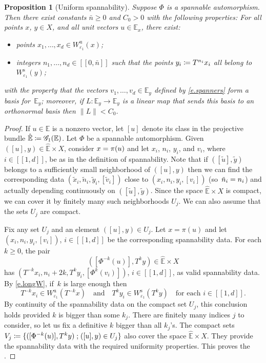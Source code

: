 \documentclass[JEP,XML,SOM,Unicode]{cedram}
\let\mathcal\mathscr
\newcommand{\ldbrack}{[\![}
\newcommand{\rdbrack}{]\!]}
\def\vcentcolon{\mathrel{\mathop\ordinarycolon}}
\providecommand\ordinarycolon{:}
\providecommand*\coloneqq{\vcentcolon\mathrel{\mkern-1.2mu}=}
\theoremstyle{plain}
\newtheorem{proposition}[theorem]{Proposition}
\theoremstyle{definition}
\newcommand{\EE}{\mathbb{E}}
\newcommand{\st}{\;\mathord{;}\;}
\newcommand{\uu}{\mathrm{u}}
\renewcommand{\ss}{\mathrm{s}}
\newcommand{\Gr}{\mathcal{G}}
\let\epsilon\varepsilon
\begin{document}
\begin{proposition}[Uniform spannability]\label{p.unif_span}
Suppose $\Phi$ is a spannable automorphism.
Then there exist constants $\bar{n} \ge 0$ and $C_0 > 0$ with the following properties:
For all points $x$, $y \in X$, and all unit vectors $u \in \EE_x$, there exist:
\begin{itemize}
	\item points $x_1, \dots, x_d \in W^\uu_{\epsilon_1}(x)$;
	\item integers $n_1, \dots, n_d \in \ldbrack 0, \bar{n} \rdbrack$ such that the points $y_i \coloneqq T^{n_i} x_i$ all belong to $W^\ss_{\epsilon_1}(y)$;
\end{itemize}
with the property that the vectors $v_1, \dots, v_d \in \EE_y$ defined by \eqref{e.spanners} form a basis for~$\EE_y$;
moreover, if $L \colon \EE_y \to \EE_y$ is a linear map that sends this basis to an orthonormal basis then $\|L\| < C_0$.
\end{proposition}

\begin{proof}
If $u \in \EE$ is a nonzero vector, let $[u]$ denote its class in the projective bundle $\hat{\EE} \coloneqq \Gr_1(\EE)$.
Let $\Phi$ be a spannable automorphism.
Given $([u], y) \in \hat{\EE} \times X$, consider $x =\nobreak \pi(u)$ and let $x_i$, $n_i$, $y_i$, and $v_i$, where $i \in \ldbrack 1,d \rdbrack$, be as in the definition of spannability.
Note that if $([\tilde u], \tilde y)$ belongs to a sufficiently small neighborhood of $([u],y)$ then we can find the corresponding data $(\tilde x_i, \tilde n_i, \tilde y_i, [\tilde v_i])$ close to $(x_i, n_i, y_i, [v_i])$ (so~$\tilde n_i =\nobreak n_i$) and actually depending continuously on $([\tilde u], \tilde y)$.
Since the space $\hat{\EE} \times X$ is compact, we can cover it by finitely many such neighborhoods $U_j$.
We can also assume that the sets $U_j$ are compact.

Fix any set $U_j$ and an element $([u],y) \in U_j$. Let $x = \pi(u)$ and let $(x_i, n_i, y_i, [v_i])$, $i \in \ldbrack 1,d \rdbrack$ be the corresponding spannability data.
For each $k \ge 0$, the pair
\[
([\Phi^{-k}(u)], T^k y) \in \hat{\EE} \times X
\]
has $(T^{-k} x_i, n_i+2k, T^k y_i, [\Phi^k(v_i)])$, $i \in \ldbrack 1,d \rdbrack$, as valid spannability data.
By \eqref{e.longW}, if~$k$ is large enough then
\[
T^{-k} x_i \in W^\uu_{\epsilon_1}(T^{-k} x) \quad\text{and}\quad T^k y_i \in W^\ss_{\epsilon_1}(T^k y) \quad \text{for each $i \in \ldbrack 1,d \rdbrack$.}
\]
By continuity of the spannability data on the compact set $U_j$, this conclusion holds provided $k$ is bigger than some $k_j$.
There are finitely many indices $j$ to consider, so let us fix a definitive $k$ bigger than all $k_j$'s.
The compact sets $V_j \coloneqq \{([\Phi^{-k}(u)], T^k y) \st ([u],y) \in U_j\}$ also cover the space $\hat{\EE} \times X$.
They provide the spannability data with the required uniformity properties.
This proves the .
\end{proof}
\end{document}
